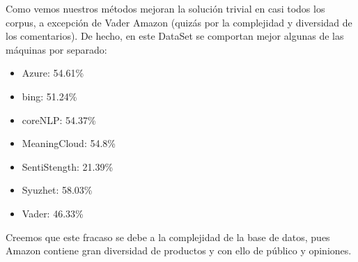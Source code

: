 \documentclass{article}
\begin{document}
\begin{table}[H]
	\begin{center}
		\caption{Comparativo de los algoritmos en los diferentes corpus.}
		\label{tabla:corpus2}
	\end{center}
\end{table}

Como vemos nuestros métodos mejoran la solución trivial en casi todos los corpus, a excepción de Vader Amazon (quizás por la complejidad y diversidad de los comentarios). De hecho, en este DataSet se comportan mejor algunas de las máquinas por separado:
\begin{itemize}
	\item Azure: 54.61\%
	\item bing: 51.24\%
	\item coreNLP: 54.37\%
	\item MeaningCloud: 54.8\%
	\item SentiStength: 21.39\%
	\item Syuzhet: 58.03\%
	\item Vader: 46.33\%
\end{itemize}
Creemos que este fracaso se debe a la complejidad de la base de datos, pues Amazon contiene gran diversidad de productos y con ello de público y opiniones.
\end{document}
